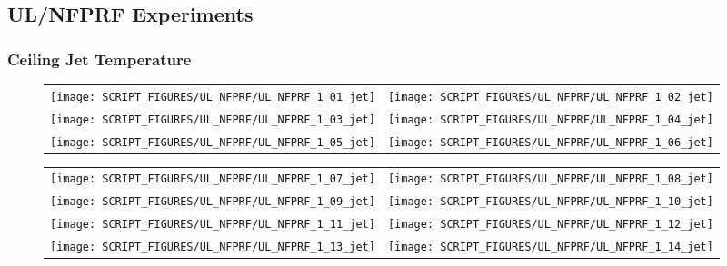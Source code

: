 \clearpage

\subsection{UL/NFPRF Experiments}

\subsubsection{Ceiling Jet Temperature}

\begin{figure}[!ht]
\begin{tabular*}{\textwidth}{l@{\extracolsep{\fill}}r}
\texttt{[image: SCRIPT\_FIGURES/UL\_NFPRF/UL\_NFPRF\_1\_01\_jet]} &
\texttt{[image: SCRIPT\_FIGURES/UL\_NFPRF/UL\_NFPRF\_1\_02\_jet]} \\
\texttt{[image: SCRIPT\_FIGURES/UL\_NFPRF/UL\_NFPRF\_1\_03\_jet]} &
\texttt{[image: SCRIPT\_FIGURES/UL\_NFPRF/UL\_NFPRF\_1\_04\_jet]} \\
\texttt{[image: SCRIPT\_FIGURES/UL\_NFPRF/UL\_NFPRF\_1\_05\_jet]} &
\texttt{[image: SCRIPT\_FIGURES/UL\_NFPRF/UL\_NFPRF\_1\_06\_jet]}
\end{tabular*}
\label{UL_NFPRF_jet_1}
\end{figure}

\newpage

\begin{figure}[!ht]
\begin{tabular*}{\textwidth}{l@{\extracolsep{\fill}}r}
\texttt{[image: SCRIPT\_FIGURES/UL\_NFPRF/UL\_NFPRF\_1\_07\_jet]} &
\texttt{[image: SCRIPT\_FIGURES/UL\_NFPRF/UL\_NFPRF\_1\_08\_jet]} \\
\texttt{[image: SCRIPT\_FIGURES/UL\_NFPRF/UL\_NFPRF\_1\_09\_jet]} &
\texttt{[image: SCRIPT\_FIGURES/UL\_NFPRF/UL\_NFPRF\_1\_10\_jet]} \\
\texttt{[image: SCRIPT\_FIGURES/UL\_NFPRF/UL\_NFPRF\_1\_11\_jet]} &
\texttt{[image: SCRIPT\_FIGURES/UL\_NFPRF/UL\_NFPRF\_1\_12\_jet]} \\
\texttt{[image: SCRIPT\_FIGURES/UL\_NFPRF/UL\_NFPRF\_1\_13\_jet]} &
\texttt{[image: SCRIPT\_FIGURES/UL\_NFPRF/UL\_NFPRF\_1\_14\_jet]}
\end{tabular*}
\label{UL_NFPRF_jet_2}
\end{figure}

